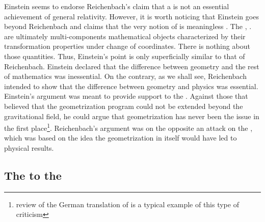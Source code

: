 \documentclass[draft]{article}
\newcommand{\PRZL}{\citetitle{Reichenbach1928}\xspace}
\begin{document}
Einstein seems to endorse Reichenbach's claim that a  is not an essential achievement of general relativity. However, it is worth noticing that Einstein goes beyond Reichenbach and claims that the very notion of  is meaningless \citep{Lehmkuhl2014}. The \gmn, \Gtmn\etc. are ultimately multi-components mathematical objects characterized by their transformation properties under change of coordinates. There is nothing  about those quantities. Thus, Einstein's point is only superficially similar to that of Reichenbach. Einstein declared that the difference between geometry and the rest of mathematics was inessential. On the contrary, as we shall see, Reichenbach intended to show that the difference between geometry and physics was essential. Einstein's argument was meant to provide support to the \uftp. Against those that believed that the geometrization program could not be extended beyond the gravitational field, he could argue that geometrization has never been the issue in the first place\footnote{ review of the German translation of \citet{Eddington1925} is a typical example of this type of criticism}. Reichenbach's argument was on the opposite an attack on the \uftp, which was based on the idea the geometrization in itself would have led to physical results.


\subsection{The \Ap to the \PRZL}
\end{document}
